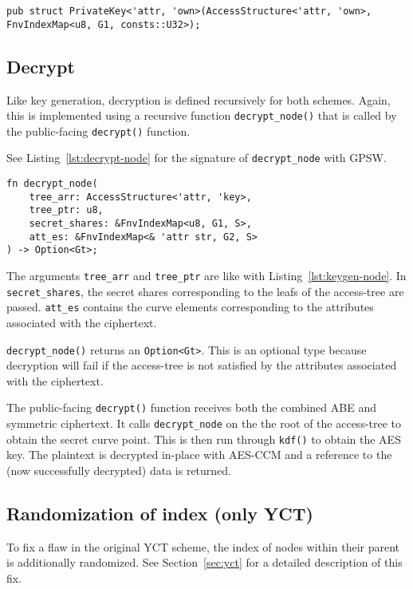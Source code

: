 \begin{lstlisting}[caption={Decryption key struct},label={lst:struct-key}, breaklines=true]
pub struct PrivateKey<'attr, 'own>(AccessStructure<'attr, 'own>, FnvIndexMap<u8, G1, consts::U32>);
\end{lstlisting}

\subsection{Decrypt}
Like key generation, decryption is defined recursively for both schemes.
Again, this is implemented using a recursive function \verb+decrypt_node()+ that is called by the public-facing \texttt{decrypt()} function.

See Listing~\ref{lst:decrypt-node} for the signature of \verb+decrypt_node+ with GPSW.

\begin{lstlisting}[caption={Function signature of recursive decryption},label={lst:decrypt-node}]
fn decrypt_node(
    tree_arr: AccessStructure<'attr, 'key>,
    tree_ptr: u8,
    secret_shares: &FnvIndexMap<u8, G1, S>,
    att_es: &FnvIndexMap<& 'attr str, G2, S>
) -> Option<Gt>;
\end{lstlisting}

The arguments \verb+tree_arr+ and \verb+tree_ptr+ are like with Listing~\ref{lst:keygen-node}.
In \verb+secret_shares+, the secret shares corresponding to the leafs of the \gls{access-tree} are passed.
\verb+att_es+ contains the curve elements corresponding to the attributes associated with the ciphertext.

\verb+decrypt_node()+ returns an \verb+Option<Gt>+.
This is an optional type because decryption will fail if the \gls{access-tree} is not satisfied by the attributes associated with the ciphertext.

The public-facing \verb+decrypt()+ function receives both the combined ABE and symmetric ciphertext. 
It calls \verb.decrypt_node. on the the root of the \gls{access-tree} to obtain the secret curve point.
This is then run through \verb+kdf()+ to obtain the AES key.
The plaintext is decrypted in-place with AES-CCM and a reference to the (now successfully decrypted) data is returned.

\subsection{Randomization of index (only YCT)}
To fix a flaw in the original YCT scheme, the index of nodes within their parent is additionally randomized.
See Section~\ref{sec:yct} for a detailed description of this fix.

